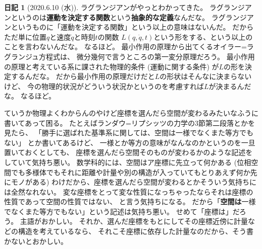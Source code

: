 \documentclass[uplatex]{jsarticle}
\theoremstyle{definition}
\newtheorem*{nikki*}{日記}
\begin{document}
\begin{nikki*}[2020.6.10 (水)]
  ラグランジアンがやっとわかってきた。
  ラグランジアンというのは\textbf{運動を決定する関数}という\textbf{抽象的な定義}なんだな。
  ラグランジアンというものに「運動を決定する関数」という以上の意味はないんだ。
  だからただ単に位置\(q\)と速度\(\dot{q}\)と時刻\(t\)の関数
  \(L(q,\dot{q},t)\)という形をする、という以上のことを言わないんだな。
  なるほど。
  最小作用の原理から出てくるオイラー=ラグランジュ方程式は、
  微分幾何で言うところの第一変分原理だろう。
  最小作用の原理と考えている系に課された物理的条件 (運動に関する条件)
  が\(L\)の形を決定するんだな。
  だから最小作用の原理だけだと\(L\)の形状はそんなに決まらないけど、
  今の物理的状況がどういう状況かというのを考慮すれば\(L\)が決まるんだな。
  なるほど。

  ていうか物理よくわからんのやけど座標を選んだら空間が変わるみたいなふうに書いてあって困る。
  たとえばランダウ=リプシッツの力学の3節第二段落とかを見たら、
  「勝手に選ばれた基準系に関しては、空間は一様でなくまた等方でもない」
  とか書いてあるけど、
  一様とか等方の意味がなんなのかというのを一旦置いておくとしても、
  座標を選んだら空間そのものが変わるかのような記述をしていて気持ち悪い。
  数学科的には、空間はア座標に先立って何かある
  (位相空間でも多様体でもそれに距離や計量や別の構造が入っていてもとりあえず何か先にモノがある)
  わけだから、座標を選んだら空間が変わるとかそういう気持ちには全然なれない。
  変な座標をとって変な性質になっちゃったならそれは座標の性質であって空間の性質ではない、
  と言う気持ちになる。
  だから「\textbf{空間は}一様でなくまた等方でもない」という記述は気持ち悪い。
  せめて「座標は」だろう。
  主語がおかしい。
  それか、選んだ座標をもとにしてその座標近傍に計量などの構造を考えているなら、
  それこそ座標に依存した計量なのだから、そう書かないとおかしい。
\end{nikki*}
\end{document}
